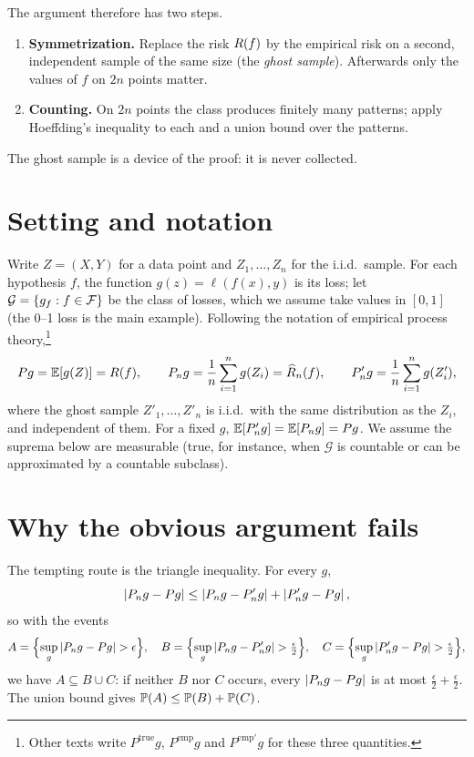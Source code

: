 \begin{notechapter}
The argument therefore has two steps.
\begin{enumerate}
  \item \textbf{Symmetrization.} Replace the risk $R(f)$ by the empirical
        risk on a second, independent sample of the same size (the
        \emph{ghost sample}). Afterwards only the values of $f$ on $2n$ points
        matter.
  \item \textbf{Counting.} On $2n$ points the class produces finitely many
        patterns; apply Hoeffding's inequality to each and a union bound over
        the patterns.
\end{enumerate}
The ghost sample is a device of the proof: it is never collected.

\section{Setting and notation}\label{symmetrization-lemma:sec:notation}

Write $Z = (X, Y)$ for a data point and $Z_1,\dots,Z_n$ for the i.i.d.\ sample.
For each hypothesis $f$, the function $g(z) = \ell(f(x), y)$ is its loss; let
$\mathcal G = \{g_f : f\in\mathcal{F}\}$ be the class of losses, which we assume take
values in $[0,1]$ (the 0--1 loss is the main example). Following the notation
of empirical process theory,\footnote{Other texts write $P^{\text{true}}g$,
$P^{\text{emp}}g$ and $P^{\text{emp}'}g$ for these three quantities.}
\[
  Pg = \mathbb{E}[g(Z)] = R(f), \qquad
  P_n g = \frac1n\sum_{i=1}^n g(Z_i) = \widehat{R}_n(f), \qquad
  P'_n g = \frac1n\sum_{i=1}^n g(Z'_i),
\]
where the ghost sample $Z'_1, \dots, Z'_n$ is i.i.d.\ with the same distribution
as the $Z_i$, and independent of them. For a fixed $g$,
$\mathbb{E}[P'_n g] = \mathbb{E}[P_n g] = Pg$. We assume the suprema below are measurable
(true, for instance, when $\mathcal G$ is countable or can be approximated by a
countable subclass).

\section{Why the obvious argument fails}\label{symmetrization-lemma:sec:naive}

The tempting route is the triangle inequality. For every $g$,
\[
  \left|P_n g - Pg\right| \leq \left|P_n g - P'_n g\right| + \left|P'_n g - Pg\right|,
\]
so with the events
\[
  A = \Bigl\{\sup_g \left|P_n g - Pg\right| > \epsilon\Bigr\},\quad
  B = \Bigl\{\sup_g \left|P_n g - P'_n g\right| > \tfrac{\epsilon}{2}\Bigr\},\quad
  C = \Bigl\{\sup_g \left|P'_n g - Pg\right| > \tfrac{\epsilon}{2}\Bigr\},
\]
we have $A \subseteq B \cup C$: if neither $B$ nor $C$ occurs, every
$\left|P_ng - Pg\right|$ is at most $\frac\epsilon2 + \frac\epsilon2$. The union bound
gives $\mathbb{P}(A) \leq \mathbb{P}(B) + \mathbb{P}(C)$.


\end{notechapter}
